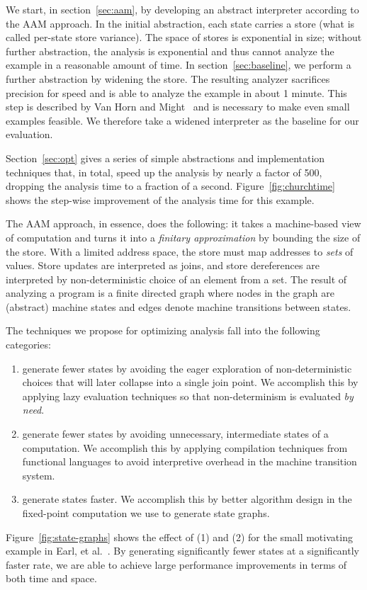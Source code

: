 \documentclass[9pt]{sigplanconf} %
\begin{document}
We start, in section~\ref{sec:aam}, by developing an abstract interpreter according to the AAM approach.
%
In the initial abstraction, each state carries a store (what is called per-state store variance).
%
The space of stores is exponential in size; without further abstraction, the analysis is exponential and thus cannot analyze the example in a reasonable amount of time.
%
In section~\ref{sec:baseline}, we perform a further abstraction by widening the store.
%
The resulting analyzer sacrifices precision for speed and is able to analyze the example in about 1 minute.
%
This step is described by Van Horn and Might~\cite[\S 3.5--6]{dvanhorn:VanHorn2012Systematic} and is necessary to make even small examples feasible.
%
We therefore take a widened interpreter as the baseline for our evaluation.

Section~\ref{sec:opt} gives a series of simple abstractions and implementation techniques that, in total, speed up the analysis by nearly a factor of 500, dropping the analysis time to a fraction of a second.
%
Figure~\ref{fig:churchtime} shows the step-wise improvement of the analysis time for this example.

The AAM approach, in essence, does the following: it takes a machine-based view of computation and turns it into a \emph{finitary approximation} by bounding the size of the store.
%
With a limited address space, the store must map addresses to \emph{sets} of values.
%
Store updates are interpreted as joins, and store dereferences are interpreted by non-deterministic choice of an element from a set.
%
The result of analyzing a program is a finite directed graph where nodes in the graph are (abstract) machine states and edges denote machine transitions between states.

The techniques we propose for optimizing analysis fall into the following categories:
\begin{enumerate}
\item generate fewer states by avoiding the eager exploration of non-deterministic choices that will later collapse into a single join point.
%
  We accomplish this by applying lazy evaluation techniques so that non-determinism is evaluated \emph{by need}.

\item generate fewer states by avoiding unnecessary, intermediate states of a computation.
%
  We accomplish this by applying compilation techniques from functional languages to avoid interpretive overhead in the machine transition system.

\item generate states faster.
%
  We accomplish this by better algorithm design in the fixed-point computation we use to generate state graphs.
\end{enumerate}
%
Figure~\ref{fig:state-graphs} shows the effect of (1) and (2) for the small motivating example in Earl, et al.~\cite{dvanhorn:Earl2012Introspective}.
%
By generating significantly fewer states at a significantly faster rate, we are able to achieve large performance improvements in terms of both time and space.
\end{document}
